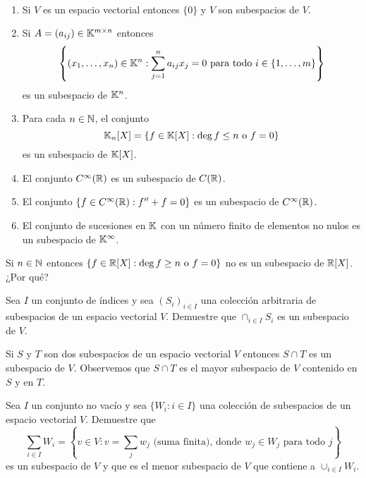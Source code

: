 \begin{examples}\
    \begin{enumerate}
        \item Si $V$ es un espacio vectorial entonces $\{0\}$ y $V$ son
            subespacios de $V$.
        \item Si $A=(a_{ij})\in\mathbb{K}^{m\times n}$ entonces
            \[
                \left\{(x_1,\dots,x_n)\in\mathbb{K}^n: \sum_{j=1}^n a_{ij}x_j=0\text{ para todo $i\in\{1,\dots,m\}$}\right\}
            \]
            es un subespacio de $\mathbb{K}^n$.
        \item Para cada $n\in\mathbb{N}$, el conjunto 
            \[
            \mathbb{K}_n[X]=\{f\in\mathbb{K}[X]: \deg f\leq n\text{ o }f=0\}
            \]
            es un subespacio de $\mathbb{K}[X]$.
        \item El conjunto $C^{\infty}(\mathbb{R})$ es un subespacio de $C(\mathbb{R})$.
		\item El conjunto $\{f\in C^\infty(\mathbb{R}):f''+f=0\}$ es un subespacio de $C^{\infty}(\mathbb{R})$.
		\item El conjunto de sucesiones en $\mathbb{K}$ con un número finito de elementos no nulos
			es un subespacio de $\mathbb{K}^{\infty}$.
    \end{enumerate}
\end{examples}

\begin{xca}
    Si $n\in\mathbb{N}$ entonces $\{f\in\mathbb{R}[X]:\deg f\geq n\text{ o }f=0\}$ no es un
    subespacio de $\mathbb{R}[X]$. ¿Por qué?
\end{xca}

\begin{xca} 
    Sea $I$ un conjunto de índices y sea $(S_i)_{i\in I}$ una colección
    arbitraria de subespacios de un espacio vectorial $V$. Demuestre que 
    $\cap_{i\in I}S_i$ es un subespacio de $V$. 
\end{xca}

\begin{block}
    Si $S$ y $T$ son dos subespacios de un espacio vectorial $V$ entonces
    $S\cap T$ es un subespacio de $V$.  Observemos que $S\cap T$ es el mayor
    subespacio de $V$ contenido en $S$ y en $T$. 
\end{block}

\begin{xca}
    Sea $I$ un conjunto no vacío y sea $\{W_i:i\in I\}$ una colección de
    subespacios de un espacio vectorial $V$.  Demuestre que 
    \[
    \sum_{i\in I}W_i=\left\{v\in V:v=\sum_j w_j\text{ (suma finita), donde $w_j\in W_j$ para todo $j$}\right\}
    \]
    es un subespacio de $V$ y que es el menor subespacio de $V$ que contiene a $\cup_{i\in I}W_i$. 
\end{xca}

